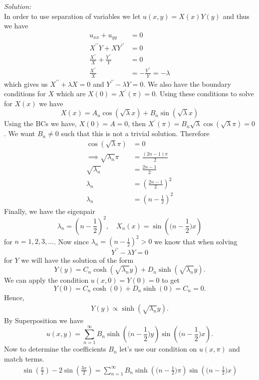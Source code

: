 \documentclass[10pt]{amsart}
\theoremstyle{nonumberplain}
\begin{document}
\begin{enumerate}[label={\bf {\arabic*}:}]
\noindent
\textit{Solution:} \\
In order to use separation of variables we let $u(x, y) = X(x) Y(y)$ and thus we have
\begin{align*}
u_{xx} + u_{yy} &= 0 \\
X^{\prime\prime}Y + XY^{\prime\prime} &= 0 \\
\frac {X^{\prime\prime}}X + \frac{Y^{\prime\prime}}{Y} &= 0 \\
\frac {X^{\prime\prime}}X &= - \frac{Y^{\prime\prime}}{Y} = - \lambda
\end{align*}
which gives us $X^{\prime\prime} + \lambda X= 0$ and $Y^{\prime\prime} - \lambda Y = 0$.
We also have the boundary conditions for $X$ which are $X(0) = X^\prime(\pi) = 0$.
Using these conditions to solve for $X(x)$ we have
$$
X(x) = A_n \cos (\sqrt \lambda x) + B_n \sin (\sqrt \lambda x)
$$
Using the BCs we have, $X(0) = A = 0$, then $X^\prime(\pi) = B_n \sqrt \lambda \cos (\sqrt \lambda \pi) = 0$.
We want $B_n \neq 0$ such that this is not a trivial solution.
Therefore
\begin{align*}
\cos (\sqrt \lambda \pi) &= 0 \\
\implies \sqrt {\lambda_n} \pi &=  \frac {(2n - 1)\pi} 2 \\
\sqrt {\lambda_n} &=  \frac {2n - 1} 2 \\
\lambda_n &=  \left( \frac {2n - 1} 2 \right) ^2 \\
\lambda_n &= \left( n - \frac 1 2 \right) ^2
\end{align*}
Finally, we have the eigenpair
$$\lambda_n = \left( n - \frac 1 2 \right) ^2, \quad X_n(x) = \sin \left( \Big( n - \frac 1 2\Big) x\right) $$
for $n = 1, 2, 3, ...$.
Now since $\lambda_n = \left( n - \frac 1 2 \right) ^2 > 0$ we know that when solving
$$
Y^{\prime\prime} - \lambda Y = 0
$$
for $Y$ we will have the solution of the form
$$
Y(y) = C_n \cosh (\sqrt {\lambda_n} y) + D_n \sinh (\sqrt {\lambda_n} y).
$$
We can apply the condition $u(x, 0) = Y(0) = 0$ to get
$$
Y(0) = C_n \cosh (0) + D_n \sinh (0) = C_n = 0.
$$
Hence,
\begin{align*}
Y(y) \propto \sinh (\sqrt {\lambda_n} y).
\end{align*}
By Superposition we have
$$
u(x, y) = \sum_{n=1}^\infty B_n \sinh \left( \Big( n - \frac 1 2\Big) y\right) \sin \left( \Big( n - \frac 1 2\Big) x\right).
$$
Now to determine the coefficients $B_n$ let's use our condition on $u(x, \pi)$ and match terms.
\begin{align*}
\sin \left( \frac x 2 \right) - 2 \sin \left( \frac {3x}{2} \right) = \sum_{n=1}^\infty B_n \sinh \left( \Big( n - \frac 1 2\Big) \pi\right) \sin \left( \Big( n - \frac 1 2\Big) x\right)

\end{align*}
\end{enumerate}
\end{document}
